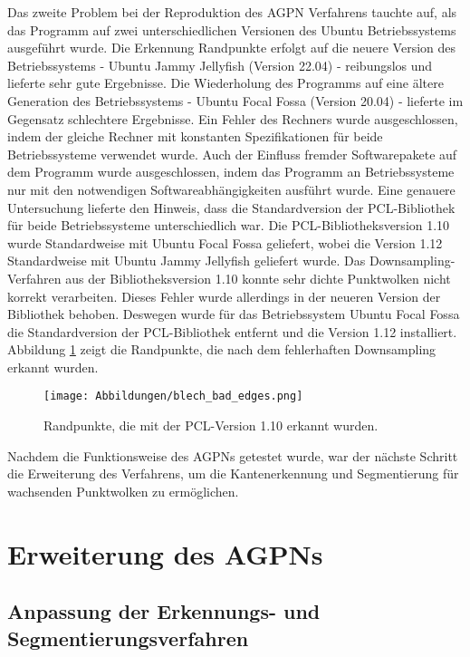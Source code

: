 Das zweite Problem bei der Reproduktion des AGPN Verfahrens tauchte auf, als das Programm auf zwei unterschiedlichen Versionen des Ubuntu Betriebssystems ausgeführt wurde. Die Erkennung Randpunkte erfolgt auf die neuere Version des Betriebssystems - Ubuntu Jammy Jellyfish (Version 22.04) - reibungslos und lieferte sehr gute Ergebnisse. Die Wiederholung des Programms auf eine ältere Generation des Betriebssystems - Ubuntu Focal Fossa (Version 20.04) - lieferte im Gegensatz schlechtere Ergebnisse. Ein Fehler des Rechners wurde ausgeschlossen, indem der gleiche Rechner mit konstanten Spezifikationen für beide Betriebssysteme verwendet wurde. Auch der Einfluss fremder Softwarepakete auf dem Programm wurde ausgeschlossen, indem das Programm an Betriebssysteme nur mit den notwendigen Softwareabhängigkeiten ausführt wurde. Eine genauere Untersuchung lieferte den Hinweis, dass die Standardversion der PCL-Bibliothek für beide Betriebssysteme unterschiedlich war. Die PCL-Bibliotheksversion 1.10 wurde Standardweise mit Ubuntu Focal Fossa geliefert, wobei die Version 1.12 Standardweise mit Ubuntu Jammy Jellyfish geliefert wurde. Das Downsampling-Verfahren aus der Bibliotheksversion 1.10 konnte sehr dichte Punktwolken nicht korrekt verarbeiten. Dieses Fehler wurde allerdings in der neueren Version der Bibliothek behoben. Deswegen wurde für das Betriebssystem Ubuntu Focal Fossa die Standardversion der PCL-Bibliothek entfernt und die Version 1.12 installiert. Abbildung \ref{bad_edges} zeigt die Randpunkte, die nach dem fehlerhaften Downsampling erkannt wurden.

\begin{figure}[h]
	\texttt{[image: Abbildungen/blech\_bad\_edges.png]}
	\centering
	\caption{Randpunkte, die mit der PCL-Version 1.10 erkannt wurden.}
	\label{bad_edges}
\end{figure}

Nachdem die Funktionsweise des AGPNs getestet wurde, war der nächste Schritt die Erweiterung des Verfahrens, um die Kantenerkennung und Segmentierung für wachsenden Punktwolken zu ermöglichen.

\section{Erweiterung des AGPNs}
\subsection{Anpassung der Erkennungs- und Segmentierungsverfahren}


